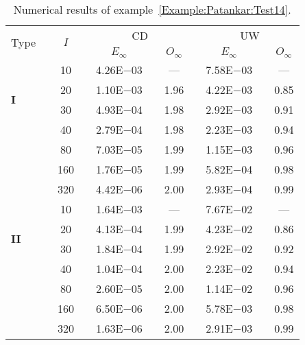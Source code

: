 {\renewcommand{\baselinestretch}{1.0}
\begin{table}[H]
\caption{Numerical results of example~\ref{Example:Patankar:Test14}.}

\setlength{\tabcolsep}{5pt}
\centering
\begin{tabular}{@{}l c c c c c c c c c c@{}}
\toprule
\multirow{2}{*}{Type} &  & \multirow{2}{*}{$I$} &  & \multicolumn{3}{c}{CD} &  & \multicolumn{3}{c}{UW} \\
\cline{5-7}
\cline{9-11}
 & & & & $E_{\infty}$ & & $O_{\infty}$ & & $E_{\infty}$ & & $O_{\infty}$\\
\midrule
\multirow{4}{*}{\textbf{I}} 
 & & 10 & & 4.26E$-$03 & & --- & & 7.58E$-$03 & & ---\\
 & & 20 & & 1.10E$-$03 & & 1.96 & & 4.22E$-$03 & & 0.85\\
 & & 30 & & 4.93E$-$04 & & 1.98 & & 2.92E$-$03 & & 0.91\\
 & & 40 & & 2.79E$-$04 & & 1.98 & & 2.23E$-$03 & & 0.94\\
 & & 80 & & 7.03E$-$05 & & 1.99 & & 1.15E$-$03 & & 0.96\\
 & & 160 & & 1.76E$-$05 & & 1.99 & & 5.82E$-$04 & & 0.98\\
 & & 320 & & 4.42E$-$06 & & 2.00 & & 2.93E$-$04 & & 0.99\\
\midrule
\multirow{4}{*}{\textbf{II}} 
 & & 10 & & 1.64E$-$03 & & --- & & 7.67E$-$02 & & ---\\
 & & 20 & & 4.13E$-$04 & & 1.99 & & 4.23E$-$02 & & 0.86\\
 & & 30 & & 1.84E$-$04 & & 1.99 & & 2.92E$-$02 & & 0.92\\
 & & 40 & & 1.04E$-$04 & & 2.00 & & 2.23E$-$02 & & 0.94\\
 & & 80 & & 2.60E$-$05 & & 2.00 & & 1.14E$-$02 & & 0.96\\
 & & 160 & & 6.50E$-$06 & & 2.00 & & 5.78E$-$03 & & 0.98\\
 & & 320 & & 1.63E$-$06 & & 2.00 & & 2.91E$-$03 & & 0.99\\
\bottomrule
\end{tabular}
\label{Table:Patankar:Test14}
\end{table}}
